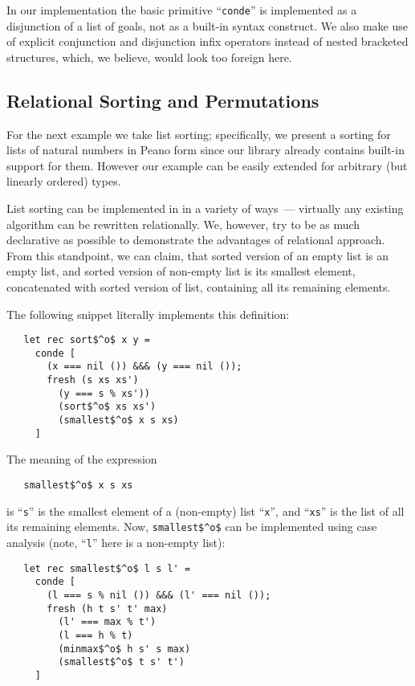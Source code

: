 In our implementation the basic \miniKanren primitive ``\lstinline{conde}'' is implemented as a
disjunction of a list of goals, not as a built-in syntax construct. We also make use of explicit
conjunction and disjunction infix operators instead of nested bracketed structures, which, we
believe, would look too foreign here.

\subsection{Relational Sorting and Permutations}

For the next example we take list sorting; specifically, we present a sorting for lists of natural numbers 
in Peano form since our library already contains built-in support for them. However our example can be 
easily extended for arbitrary (but linearly ordered) types.

List sorting can be implemented in \miniKanren in a variety of ways~--- virtually any existing algorithm can 
be rewritten relationally. We, however, try to be as much declarative as possible to demonstrate the
advantages of relational approach. From this standpoint, we can claim, that sorted version of an empty list is an 
empty list, and sorted version of non-empty list is its smallest element, concatenated with sorted
version of list, containing all its remaining elements.

The following snippet literally implements this definition:

\begin{lstlisting}
   let rec sort$^o$ x y = 
     conde [
       (x === nil ()) &&& (y === nil ());
       fresh (s xs xs')
         (y === s % xs'))
         (sort$^o$ xs xs')       
         (smallest$^o$ x s xs)
     ]
\end{lstlisting}

The meaning of the expression

\begin{lstlisting}
   smallest$^o$ x s xs
\end{lstlisting}

is  ``\lstinline{s}'' is the smallest element of a (non-empty) list ``\lstinline{x}'', and ``\lstinline{xs}'' is the 
list of all its remaining elements. Now, \lstinline{smallest$^o$} can be implemented using case analysis (note, 
``\lstinline{l}'' here is a non-empty list):

\begin{lstlisting}
   let rec smallest$^o$ l s l' = 
     conde [       
       (l === s % nil ()) &&& (l' === nil ());
       fresh (h t s' t' max)
         (l' === max % t')
         (l === h % t)
         (minmax$^o$ h s' s max)
         (smallest$^o$ t s' t')
     ] 
\end{lstlisting}

